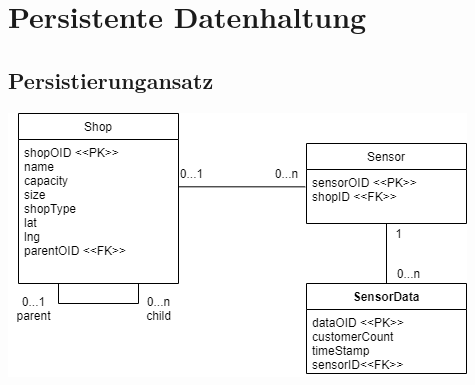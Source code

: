 \documentclass[runningheads]{llncs}
\begin{document}
\newpage
\section{Persistente Datenhaltung}

\subsection{Persistierungansatz}
\includegraphics[width=\linewidth]{images/Datamodel}
\end{document}
